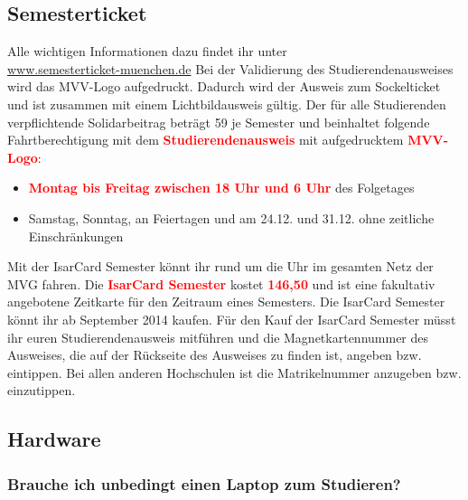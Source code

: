 \subsection{Semesterticket}

Alle wichtigen Informationen dazu findet ihr unter\\
\url{www.semesterticket-muenchen.de}\doublebreak
Bei der Validierung des Studierendenausweises wird das MVV-Logo aufgedruckt. Dadurch wird der Ausweis zum Sockelticket und ist zusammen mit einem Lichtbildausweis gültig. Der für alle Studierenden verpflichtende Solidarbeitrag beträgt 59 \texteuro je Semester und beinhaltet folgende Fahrtberechtigung mit dem \textcolor{red}{\textbf{Studierendenausweis}} mit aufgedrucktem \textcolor{red}{\textbf{MVV-Logo}}:
\begin{itemize}
	\item \textcolor{red}{\textbf{Montag bis Freitag zwischen 18 Uhr und 6 Uhr}} des Folgetages
	\item Samstag, Sonntag, an Feiertagen und am 24.12. und 31.12. ohne
	zeitliche Einschränkungen
\end{itemize}
Mit der IsarCard Semester könnt ihr rund um die Uhr im gesamten Netz der MVG fahren. Die \textcolor{red}{\textbf{IsarCard Semester}} kostet \textcolor{red}{\textbf{146,50}} \texteuro und ist eine fakultativ angebotene Zeitkarte für den Zeitraum eines Semesters. Die IsarCard Semester könnt ihr ab September 2014 kaufen. Für den Kauf der IsarCard Semester müsst ihr euren Studierendenausweis mitführen und die Magnetkartennummer des Ausweises, die auf der Rückseite des Ausweises zu finden ist, angeben bzw. eintippen. Bei allen anderen Hochschulen ist die Matrikelnummer anzugeben bzw. einzutippen.

\subsection{Hardware}

\subsubsection{Brauche ich unbedingt einen Laptop zum Studieren?}

